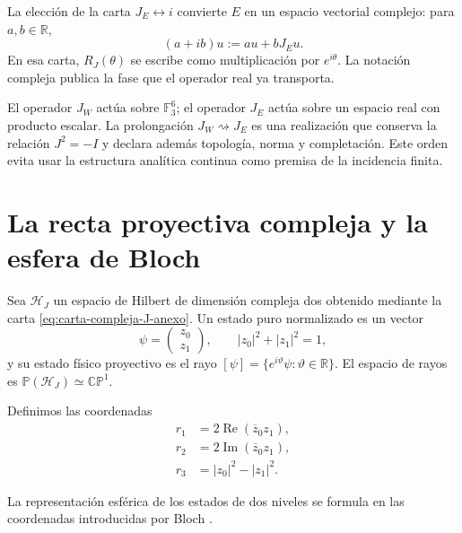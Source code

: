 La elección de la carta \(J_E\leftrightarrow i\) convierte \(E\) en un
espacio vectorial complejo: para \(a,b\in\mathbb R\),
\begin{equation}
 (a+ib)u:=au+bJ_Eu.
 \label{eq:carta-compleja-J-anexo}
\end{equation}
En esa carta, \(R_J(\theta)\) se escribe como multiplicación por
\(e^{i\theta}\). La notación compleja publica la fase que el operador real ya
transporta.

\begin{remark}
El operador \(J_W\) actúa sobre \(\mathbb F_3^6\); el operador \(J_E\) actúa
sobre un espacio real con producto escalar. La prolongación
\(J_W\rightsquigarrow J_E\) es una realización que conserva la relación
\(J^2=-I\) y declara además topología, norma y completación. Este orden evita
usar la estructura analítica continua como premisa de la incidencia finita.
\end{remark}

\section{La recta proyectiva compleja y la esfera de Bloch}

Sea \(\mathcal H_J\) un espacio de Hilbert de dimensión compleja dos obtenido
mediante la carta \eqref{eq:carta-compleja-J-anexo}. Un estado puro normalizado
es un vector
\begin{equation}
 \psi=\begin{pmatrix}z_0\\ z_1\end{pmatrix},
 \qquad |z_0|^2+|z_1|^2=1,
 \label{eq:espinor-normalizado-anexo}
\end{equation}
y su estado físico proyectivo es el rayo
\([\psi]=\{e^{i\vartheta}\psi:\vartheta\in\mathbb R\}\).
El espacio de rayos es \(\mathbb P(\mathcal H_J)\simeq\mathbb{CP}^{1}\).

Definimos las coordenadas
\begin{equation}
 \begin{aligned}
 r_1&=2\operatorname{Re}(\overline z_0z_1),\\
 r_2&=2\operatorname{Im}(\overline z_0z_1),\\
 r_3&=|z_0|^2-|z_1|^2.
 \end{aligned}
 \label{eq:coordenadas-bloch-anexo}
\end{equation}

La representación esférica de los estados de dos niveles se formula en las
coordenadas introducidas por Bloch \cite{Bloch1946}.

